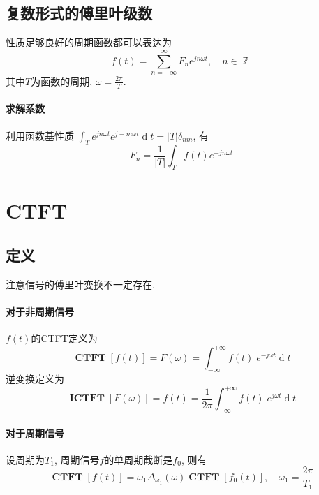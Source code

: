 \documentclass{ctexart}
\DeclareMathOperator{\CTFT}{\mathbf{CTFT}}
\DeclareMathOperator{\ICTFT}{\mathbf{ICTFT}}
\DeclareMathOperator{\ud}{\mathrm{d}}
\DeclareMathOperator{\Zset}{\mathbb{Z}}
\begin{document}
\subsection{复数形式的傅里叶级数}
    性质足够良好的周期函数都可以表达为\[
        f(t) = \sum_{n = -\infty}^{\infty} F_n e^{j n \omega t},\quad n \in \Zset
    \]其中$T$为函数的周期, $\omega = \frac{2\pi}{T}$.
\paragraph{求解系数}
    利用函数基性质 $\int_T e^{j n \omega t} e^{j -m \omega t} \ud t = |T| \delta_{nm}$,
    有\[
        F_n = \frac{1}{|T|} \int_T f(t) e^{-j n \omega t}\]

\section{CTFT}
\subsection{定义}
注意信号的傅里叶变换不一定存在.
\paragraph{对于非周期信号} $f(t)$的CTFT定义为 \[
    \CTFT[f(t)] = F(\omega) = \int_{-\infty}^{+\infty} f(t)\; e^{-j \omega t} \ud t \]
    逆变换定义为 \[
    \ICTFT[F(\omega)] = f(t) = \frac{1}{2\pi} \int_{-\infty}^{+\infty} f(t)\; e^{j \omega t} \ud t \]

\paragraph{对于周期信号}
    设周期为$T_1$, 周期信号$f$的单周期截断是$f_0$, 则有 \[
        \CTFT[ f(t) ] = \omega_1 \Delta_{\omega_1}(\omega) \CTFT[ f_0(t) ] ,\quad \omega_1 = \frac{2\pi}{T_1}  \]
\end{document}
